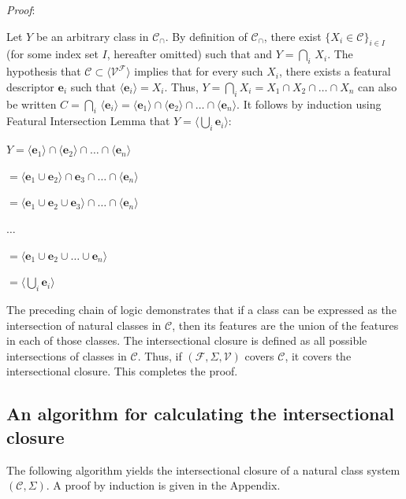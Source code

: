 \documentclass[11pt, oneside]{article}   	%
\begin{document}
\vspace{\baselineskip} \noindent \textit{Proof}:

Let $Y$ be an arbitrary class in $\mathcal C_\cap$. By definition of $\mathcal C_\cap$, there exist $\{X_i \in \mathcal C\}_{i \in I}$ (for some index set $I$, hereafter omitted) such that and $Y = \bigcap_i \, X_i$. The hypothesis that $\mathcal C \subset \langle \mathcal V^\mathcal F \rangle $ implies that for every such $X_i$, there exists a featural descriptor $\mathbf{e}_i$ such that $\langle \mathbf{e}_i \rangle = X_i$. Thus, $Y = \bigcap_i X_i = X_1 \cap X_2 \cap \ldots \cap X_n$ can also be written $C = \bigcap_i \, \langle \mathbf{e}_i \rangle = \langle \mathbf{e}_1 \rangle \cap \langle \mathbf{e}_2 \rangle \cap \ldots \cap \langle \mathbf{e}_n \rangle$. It follows by induction using Featural Intersection Lemma that $Y = \langle \bigcup_i \mathbf{e}_i \rangle$:

$Y = \langle \mathbf{e}_1 \rangle \cap  \langle \mathbf{e}_2 \rangle \cap \ldots \cap  \langle \mathbf{e}_n \rangle$

\quad $ = \langle \mathbf{e}_1 \cup \mathbf{e}_2 \rangle \cap \mathbf{e}_3 \cap \ldots \cap \langle \mathbf{e}_n \rangle$

\quad $ = \langle \mathbf{e}_1 \cup \mathbf{e}_2 \cup \mathbf{e}_3 \rangle \cap \ldots \cap \langle \mathbf{e}_n \rangle$

\quad $\ldots$

\quad $= \langle \mathbf{e}_1 \cup \mathbf{e}_2 \cup \ldots \cup \mathbf{e}_n \rangle$

\quad $= \langle \bigcup_i  \mathbf{e}_i \rangle$

\noindent The preceding chain of logic demonstrates that if a class can be expressed as the intersection of natural classes in $\mathcal C$, then its features are the union of the features in each of those classes. The intersectional closure is defined as all possible intersections of classes in $\mathcal C$. Thus, if $(\mathcal F, \Sigma, \mathcal V)$ covers $\mathcal C$, it covers the intersectional closure. This completes the proof.

\subsection{An algorithm for calculating the intersectional closure}

The following algorithm yields the intersectional closure of a natural class system $(\mathcal C, \Sigma)$. A proof by induction is given in the Appendix.
\end{document}
